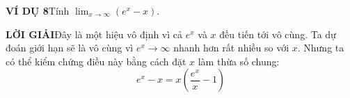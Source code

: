 \vspace{0.8em}
\noindent\textcolor{stewartblue}{\textbf{VÍ DỤ 8}}\quad Tính $\lim_{x \to \infty} (e^x - x)$.

\vspace{0.3em}
\noindent\textcolor{stewartblue}{\textbf{LỜI GIẢI}}\quad Đây là một hiệu vô định vì cả $e^x$ và $x$ đều tiến tới vô cùng. Ta dự đoán giới hạn sẽ là vô cùng vì $e^x \to \infty$ nhanh hơn rất nhiều so với $x$. Nhưng ta có thể kiểm chứng điều này bằng cách đặt $x$ làm thừa số chung:
\[
e^x - x = x\left( \frac{e^x}{x} - 1 \right)
\]
